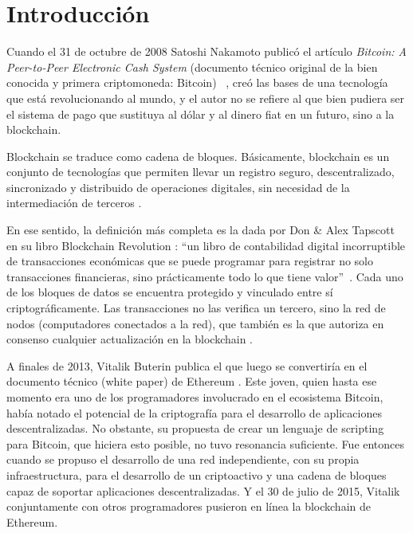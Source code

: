 \chapter*{Introducción}\label{chapter:introduction}

  \hspace*{}

  Cuando el 31 de octubre de 2008 Satoshi Nakamoto publicó el artículo \textit{Bitcoin: A Peer-to-Peer Electronic Cash System} (documento 
  técnico original de la bien conocida y primera criptomoneda: Bitcoin) ~\parencite{satoshi2008}, creó las bases de una tecnología que 
  está revolucionando al mundo, y el autor no se refiere al que bien pudiera ser el sistema de pago que sustituya al dólar y al dinero 
  fiat en un futuro, sino a la blockchain.
  
  Blockchain se traduce como cadena de bloques. Básicamente, blockchain es un conjunto de tecnologías que permiten llevar un registro 
  seguro, descentralizado, sincronizado y distribuido de operaciones digitales, sin necesidad de la intermediación de terceros \parencite{solunion2021}.

  En ese sentido, la definición más completa es la dada por Don \& Alex Tapscott en su libro Blockchain Revolution 
  : “un libro de 
  contabilidad digital incorruptible de transacciones económicas que se puede programar para registrar no solo transacciones financieras, 
  sino prácticamente todo lo que tiene valor”~\parencite{tapscott2016blockchain}. Cada uno de los bloques de datos se encuentra protegido y vinculado entre sí 
  criptográficamente. Las transacciones no las verifica un tercero, sino la red 
  de nodos (computadores conectados a la red), que también es la que autoriza en consenso cualquier actualización en la blockchain \parencite{solunion2021}.

  A finales de 2013, Vitalik Buterin publica el que luego se convertiría en el documento técnico (white paper) de Ethereum 
  \parencite{buterin2013}. Este joven, quien hasta ese momento era uno de los
  programadores involucrado en el ecosistema Bitcoin, había notado el potencial de la criptografía para el desarrollo de aplicaciones 
  descentralizadas. No obstante, su propuesta de crear un lenguaje de scripting para Bitcoin, que hiciera esto posible, no tuvo resonancia 
  suficiente. Fue entonces cuando se propuso el desarrollo de una red independiente, con su propia infraestructura, para el desarrollo de 
  un criptoactivo y una cadena de bloques capaz de soportar aplicaciones descentralizadas. Y el 30 de julio de 2015, Vitalik conjuntamente
  con otros programadores pusieron en línea la blockchain de Ethereum. \parencite{diaz2018}
  
